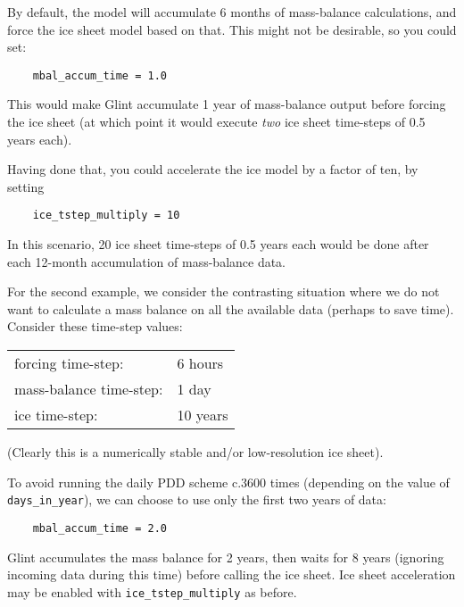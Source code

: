 By default, the model will accumulate 6 months of mass-balance 
calculations, and force the ice sheet model based on that. This might not be 
desirable, so you could set:

\begin{verbatim}
    mbal_accum_time = 1.0
\end{verbatim}

This would make Glint accumulate 1 year of mass-balance output before 
forcing the ice sheet (at which point it would execute \emph{two} ice sheet 
time-steps of 0.5 years each).

Having done that, you could accelerate the ice model by a factor of ten, by 
setting

\begin{verbatim}
    ice_tstep_multiply = 10
\end{verbatim}
%
In this scenario, 20 ice sheet time-steps of 0.5 years each would be done 
after each 12-month accumulation of mass-balance data.

For the second example, we consider the contrasting situation where we do not want to calculate a 
mass balance on all the available data (perhaps to save time). Consider 
these time-step values:

\vspace{0.5cm}
\begin{tabular}{ll}
forcing time-step:   &   6 hours \\
mass-balance time-step: & 1 day \\
ice time-step:       &   10 years
\end{tabular}
\vspace{0.5cm}
%
(Clearly this is a numerically stable and/or low-resolution ice sheet).

To avoid running the daily PDD scheme c.3600 times (depending on the value of 
\texttt{days\_in\_year}), we can choose to use only the first two years of data:

\begin{verbatim}
    mbal_accum_time = 2.0
\end{verbatim}
%
Glint accumulates the mass balance for 2 years, then waits for 8 years (ignoring incoming 
data during this time) before calling the ice sheet. Ice sheet 
acceleration may be enabled with \texttt{ice\_tstep\_multiply} as before.

%



